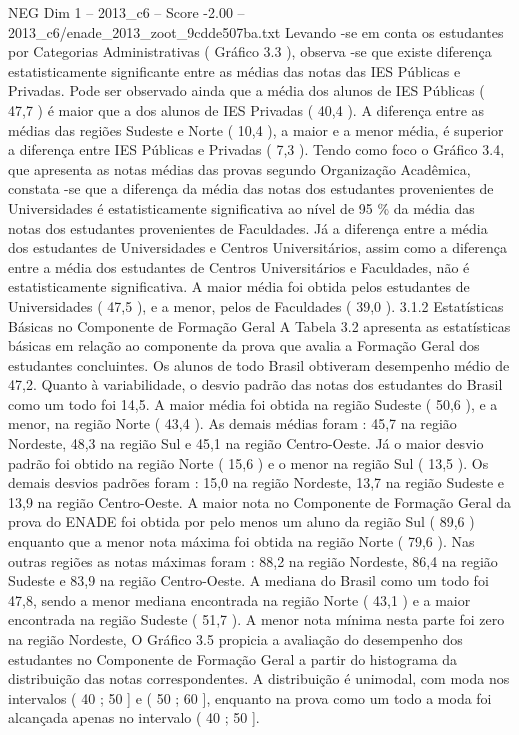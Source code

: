 \begin{textsample}{NEG Dim 1 – 2013\_c6 – Score -2.00 – 2013\_c6/enade\_2013\_zoot\_9cdde507ba.txt}
Levando -se em conta os estudantes por Categorias Administrativas ( Gráfico 3.3 ), observa -se que existe diferença estatisticamente significante entre as médias das notas das IES Públicas e Privadas.
Pode ser observado ainda que a média dos alunos de IES Públicas ( 47,7 ) é maior que a dos alunos de IES Privadas ( 40,4 ).
A diferença entre as médias das regiões Sudeste e Norte ( 10,4 ), a maior e a menor média, é superior a diferença entre IES Públicas e Privadas ( 7,3 ).
Tendo como foco o Gráfico 3.4, que apresenta as notas médias das provas segundo Organização Acadêmica, constata -se que a diferença da média das notas dos estudantes provenientes de Universidades é estatisticamente significativa ao nível de 95 \% da média das notas dos estudantes provenientes de Faculdades.
Já a diferença entre a média dos estudantes de Universidades e Centros Universitários, assim como a diferença entre a média dos estudantes de Centros Universitários e Faculdades, não é estatisticamente significativa.
A maior média foi obtida pelos estudantes de Universidades ( 47,5 ), e a menor, pelos de Faculdades ( 39,0 ). 3.1.2 Estatísticas Básicas no Componente de Formação Geral A Tabela 3.2 apresenta as estatísticas básicas em relação ao componente da prova que avalia a Formação Geral dos estudantes concluintes.
Os alunos de todo Brasil obtiveram desempenho médio de 47,2.
Quanto à variabilidade, o desvio padrão das notas dos estudantes do Brasil como um todo foi 14,5.
A maior média foi obtida na região Sudeste ( 50,6 ), e a menor, na região Norte ( 43,4 ).
As demais médias foram : 45,7 na região Nordeste, 48,3 na região Sul e 45,1 na região Centro-Oeste.
Já o maior desvio padrão foi obtido na região Norte ( 15,6 ) e o menor na região Sul ( 13,5 ).
Os demais desvios padrões foram : 15,0 na região Nordeste, 13,7 na região Sudeste e 13,9 na região Centro-Oeste.
A maior nota no Componente de Formação Geral da prova do ENADE foi obtida por pelo menos um aluno da região Sul ( 89,6 ) enquanto que a menor nota máxima foi obtida na região Norte ( 79,6 ).
Nas outras regiões as notas máximas foram : 88,2 na região Nordeste, 86,4 na região Sudeste e 83,9 na região Centro-Oeste.
A mediana do Brasil como um todo foi 47,8, sendo a menor mediana encontrada na região Norte ( 43,1 ) e a maior encontrada na região Sudeste ( 51,7 ).
A menor nota mínima nesta parte foi zero na região Nordeste, O Gráfico 3.5 propicia a avaliação do desempenho dos estudantes no Componente de Formação Geral a partir do histograma da distribuição das notas correspondentes.
A distribuição é unimodal, com moda nos intervalos ( 40 ; 50 ] e ( 50 ; 60 ], enquanto na prova como um todo a moda foi alcançada apenas no intervalo ( 40 ; 50 ].

\end{textsample}
